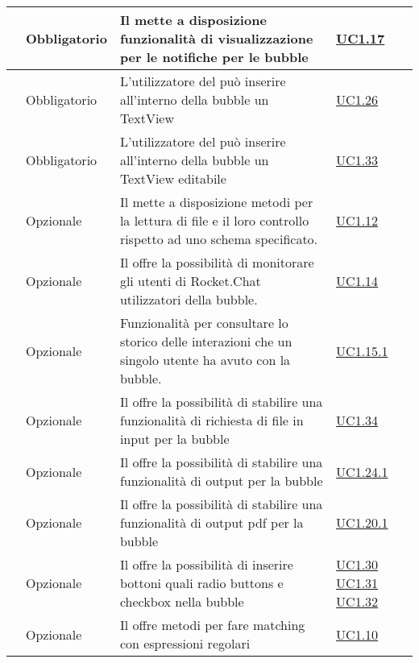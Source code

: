 \begin{longtable}{|P{1.5cm}|P{3cm}|P{6cm}|P{2.5cm}|}
	\hline \RequisitoObF\label{L16} & Obbligatorio & Il  mette a disposizione funzionalità di visualizzazione per le notifiche per le bubble & \hyperref[UC1.17]{UC1.17} \\
	\hline \RequisitoObF\label{L33} & Obbligatorio & L’utilizzatore del  può inserire all'interno della bubble un TextView & \hyperref[UC1.26]{UC1.26} \\
	\hline \RequisitoObF\label{L34} & Obbligatorio & L’utilizzatore del  può inserire all'interno della bubble un TextView editabile & \hyperref[UC1.33]{UC1.33} \\
	\hline \RequisitoOpF\label{L35} & Opzionale & Il  mette a disposizione metodi per la lettura di file  e il loro controllo rispetto ad uno schema specificato. & \hyperref[UC1.12]{UC1.12} \\
	\hline \RequisitoOpF\label{L36} & Opzionale & Il  offre la possibilità di monitorare gli utenti di Rocket.Chat utilizzatori della bubble. & \hyperref[UC1.14]{UC1.14} \\
	\hline \RequisitoOpF\label{L37} & Opzionale & Funzionalità per consultare lo storico delle interazioni che un singolo utente ha avuto con la bubble. & \hyperref[UC1.15.1]{UC1.15.1} \\
	\hline \RequisitoOpF\label{L38} & Opzionale & Il  offre la possibilità di stabilire una funzionalità di richiesta di file in input per la bubble & \hyperref[UC1.34]{UC1.34} \\
	\hline \RequisitoOpF\label{L39} & Opzionale & Il  offre la possibilità di stabilire una funzionalità di output per la bubble & \hyperref[UC1.24.1]{UC1.24.1} \\
	\hline \RequisitoOpF\label{L40} & Opzionale & Il  offre la possibilità di stabilire una funzionalità di output pdf per la bubble & \hyperref[UC1.20.1]{UC1.20.1} \\	
	\hline \RequisitoOpF\label{L41} & Opzionale & Il  offre la possibilità di inserire bottoni quali radio buttons e checkbox nella bubble & \hyperref[UC1.30]{UC1.30} \linebreak \hyperref[UC1.31]{UC1.31} \linebreak \hyperref[UC1.32]{UC1.32} \\
	\hline \RequisitoOpF\label{L42} & Opzionale & Il  offre metodi per fare matching con espressioni regolari
	 & \hyperref[UC1.10]{UC1.10} \\

\end{longtable}
